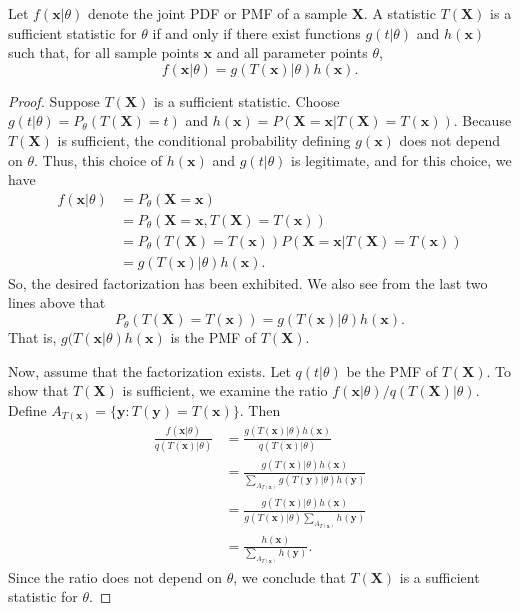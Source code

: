 \begin{theorem}
Let $f(\mathbf{x}|\theta)$ denote the joint PDF or PMF of a sample $\mathbf{X}$.
A statistic $T(\mathbf{X})$ is a sufficient statistic for $\theta$ if and only if there exist functions $g(t|\theta)$ and $h(\mathbf{x})$ such that, for all sample points $\mathbf{x}$ and all parameter points $\theta$,
\begin{equation*}
f(\mathbf{x}|\theta) = g(T(\mathbf{x})|\theta) h(\mathbf{x}) .
\end{equation*}
\end{theorem}
\begin{proof}
Suppose $T(\mathbf{X})$ is a sufficient statistic.
Choose $g(t|\theta) = P_{\theta} (T(\mathbf{X}) = t)$ and $h(\mathbf{x}) = P(\mathbf{X} = \mathbf{x} | T(\mathbf{X}) = T(\mathbf{x}))$.
Because $T(\mathbf{X})$ is sufficient, the conditional probability defining $g(\mathbf{x})$ does not depend on $\theta$.
Thus, this choice of $h(\mathbf{x})$ and $g(t|\theta)$ is legitimate, and for this choice, we have
\begin{equation*}
\begin{split}
f(\mathbf{x}|\theta) &= P_{\theta} (\mathbf{X} = \mathbf{x}) \\
&= P_{\theta} (\mathbf{X} = \mathbf{x}, T(\mathbf{X}) = T(\mathbf{x})) \\
&= P_{\theta} (T(\mathbf{X}) = T(\mathbf{x}))
P (\mathbf{X} = \mathbf{x} | T(\mathbf{X}) = T(\mathbf{x})) \\
&= g(T(\mathbf{x})|\theta) h(\mathbf{x}) .
\end{split}
\end{equation*}
So, the desired factorization has been exhibited.
We also see from the last two lines above that
\begin{equation*}
P_{\theta} (T(\mathbf{X}) = T(\mathbf{x}))
= g(T(\mathbf{x})|\theta) h(\mathbf{x}) .
\end{equation*}
That is, $g(T(\mathbf{x}|\theta) h(\mathbf{x})$ is the PMF of $T(\mathbf{X})$.

Now, assume that the factorization exists.
Let $q(t|\theta)$ be the PMF of $T(\mathbf{X})$.
To show that $T(\mathbf{X})$ is sufficient, we examine the ratio $f(\mathbf{x}|\theta)/q(T(\mathbf{X})|\theta)$.
Define $A_{T(\mathbf{x})} = \{ \mathbf{y} : T(\mathbf{y}) = T(\mathbf{x}) \}$.
Then
\begin{equation*}
\begin{split}
\frac{ f(\mathbf{x}|\theta) }{ q(T(\mathbf{x})|\theta) }
&= \frac{ g(T(\mathbf{x})|\theta) h(\mathbf{x}) }{ q(T(\mathbf{x})|\theta) } \\
&= \frac{ g(T(\mathbf{x})|\theta) h(\mathbf{x}) }{ \sum_{A_{T(\mathbf{x})}} g(T(\mathbf{y})|\theta) h(\mathbf{y}) } \\
&= \frac{ g(T(\mathbf{x})|\theta) h(\mathbf{x}) }{ g(T(\mathbf{x})|\theta) \sum_{A_{T(\mathbf{x})}} h(\mathbf{y}) } \\
&= \frac{ h(\mathbf{x}) }{ \sum_{A_{T(\mathbf{x})}} h(\mathbf{y}) } .
\end{split}
\end{equation*}
Since the ratio does not depend on $\theta$, we conclude that $T(\mathbf{X})$ is a sufficient statistic for $\theta$.
\end{proof}

